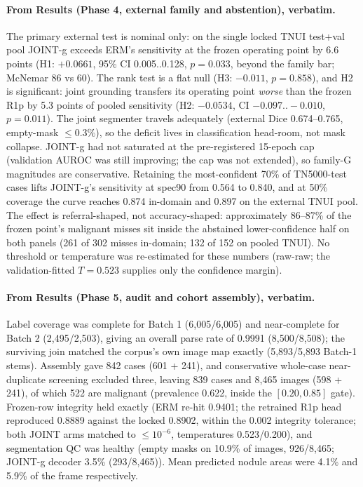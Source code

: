 \documentclass[11pt]{article}
\begin{document}
\paragraph{From Results (Phase 4, external family and abstention), verbatim.}
The primary external test is nominal only: on the single locked TNUI
test+val pool JOINT-g exceeds ERM's sensitivity at the frozen operating
point by 6.6 points (H1: $+0.0661$, 95\% CI 0.005..0.128, $p{=}0.033$,
beyond the family bar; McNemar 86 vs 60). The rank test is a flat null
(H3: $-0.011$, $p{=}0.858$), and H2 is significant: joint grounding
transfers its operating point \emph{worse} than the frozen R1p by 5.3
points of pooled sensitivity (H2: $-0.0534$, CI $-0.097..-0.010$,
$p{=}0.011$). The joint segmenter travels adequately (external Dice
0.674--0.765, empty-mask $\leq 0.3\%$), so the deficit lives in
classification head-room, not mask collapse. JOINT-g had not saturated
at the pre-registered 15-epoch cap (validation AUROC was still
improving; the cap was not extended), so family-G magnitudes are
conservative. Retaining the most-confident 70\% of TN5000-test cases
lifts JOINT-g's sensitivity at spec90 from 0.564 to 0.840, and at 50\%
coverage the curve reaches 0.874 in-domain and 0.897 on the external
TNUI pool. The effect is referral-shaped, not accuracy-shaped:
approximately 86--87\% of the frozen point's malignant misses sit inside
the abstained lower-confidence half on both panels (261 of 302 misses
in-domain; 132 of 152 on pooled TNUI). No threshold or temperature was
re-estimated for these numbers (raw-raw; the validation-fitted
$T{=}0.523$ supplies only the confidence margin).

\paragraph{From Results (Phase 5, audit and cohort assembly), verbatim.}
Label coverage was complete for Batch 1 (6{,}005/6{,}005) and
near-complete for Batch 2 (2{,}495/2{,}503), giving an overall parse
rate of 0.9991 (8{,}500/8{,}508); the surviving join matched the
corpus's own image map exactly (5{,}893/5{,}893 Batch-1 stems). Assembly
gave 842 cases (601 + 241), and conservative whole-case near-duplicate
screening excluded three, leaving 839 cases and 8{,}465 images
(598 + 241), of which 522 are malignant (prevalence 0.622, inside the
$[0.20, 0.85]$ gate). Frozen-row integrity held exactly (ERM re-hit
0.9401; the retrained R1p head reproduced 0.8889 against the locked
0.8902, within the 0.002 integrity tolerance; both JOINT arms matched to
$\leq 10^{-6}$, temperatures 0.523/0.200), and segmentation QC was
healthy (empty masks on 10.9\% of images, 926/8{,}465; JOINT-g decoder
3.5\% (293/8{,}465)). Mean predicted nodule areas were 4.1\% and 5.9\%
of the frame respectively.
\end{document}

